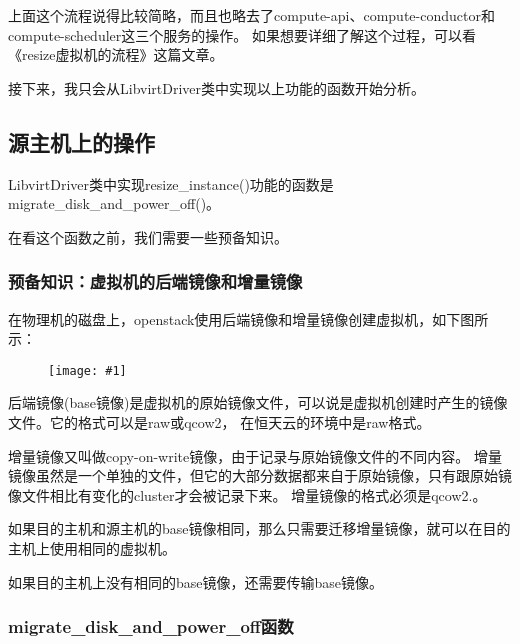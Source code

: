 \documentclass[a4paper,left=1.5cm,right=1.5cm,11pt]{article}
\newcommand{\fic}[1]{\begin{figure}[H]
		\center
		\texttt{[image: \#1]}
	\end{figure}}
\begin{document}
	上面这个流程说得比较简略，而且也略去了compute-api、compute-conductor和compute-scheduler这三个服务的操作。
	如果想要详细了解这个过程，可以看《resize虚拟机的流程》这篇文章。\par

	接下来，我只会从LibvirtDriver类中实现以上功能的函数开始分析。

\subsection{源主机上的操作}
	LibvirtDriver类中实现resize\_instance()功能的函数是migrate\_disk\_and\_power\_off()。\par

	在看这个函数之前，我们需要一些预备知识。

\subsubsection{预备知识：虚拟机的后端镜像和增量镜像}
	在物理机的磁盘上，openstack使用后端镜像和增量镜像创建虚拟机，如下图所示：
	\fic{4.png}

	后端镜像(base镜像)是虚拟机的原始镜像文件，可以说是虚拟机创建时产生的镜像文件。它的格式可以是raw或qcow2，
	在恒天云的环境中是raw格式。\par

	增量镜像又叫做copy-on-write镜像，由于记录与原始镜像文件的不同内容。
	增量镜像虽然是一个单独的文件，但它的大部分数据都来自于原始镜像，只有跟原始镜像文件相比有变化的cluster才会被记录下来。
	增量镜像的格式必须是qcow2.。\par

	如果目的主机和源主机的base镜像相同，那么只需要迁移增量镜像，就可以在目的主机上使用相同的虚拟机。\par

	如果目的主机上没有相同的base镜像，还需要传输base镜像。

\subsubsection{migrate\_disk\_and\_power\_off函数}
\end{document}
